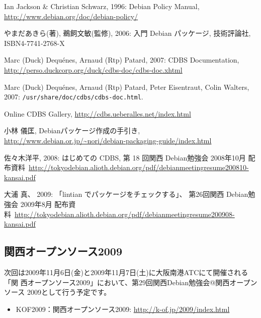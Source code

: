 \documentclass[mingoth,a4paper]{jsarticle}
\begin{document}
\begin{thebibliography}{99}
    Ian Jackson \& Christian Schwarz, 1996:
    Debian Policy Manual,
    \url{http://www.debian.org/doc/debian-policy/}

  やまだあきら(著), 鵜飼文敏(監修), 2006: 入門 Debian パッケージ, 技術評論社,
  ISBN4-7741-2768-X

  Marc (Duck) Dequ\'enes, Arnaud (Rtp) Patard, 2007:
  CDBS Documentation,
  \url{http://perso.duckcorp.org/duck/cdbs-doc/cdbs-doc.xhtml}
  
  Marc (Duck) Dequ\'enes, Arnaud (Rtp) Patard, 
  Peter Eisentraut, Colin Walters, 2007:
  {\tt /usr/share/doc/cdbs/cdbs-doc.html}.
  
  Online CDBS Gallery, 
  \url{http://cdbs.ueberalles.net/index.html}
  
  小林 儀匡, 
  Debianパッケージ作成の手引き,
  \url{http://www.debian.or.jp/~nori/debian-packaging-guide/index.html}

  佐々木洋平, 2008:
  はじめての CDBS,
  第 18 回関西 Debian勉強会 2008年10月 配布資料\
  \url{http://tokyodebian.alioth.debian.org/pdf/debianmeetingresume200810-kansai.pdf}
  
  大浦 真、 2009:
  「lintian でパッケージをチェックする」、
  第26回関西 Debian勉強会 2009年8月 配布資料\
  \url{http://tokyodebian.alioth.debian.org/pdf/debianmeetingresume200908-kansai.pdf}
\end{thebibliography}


\subsection{関西オープンソース2009}

次回は2009年11月6日(金)と2009年11月7日(土)に大阪南港ATCにて開催される「関
西オープンソース2009」において、第29回関西Debian勉強会@関西オープンソース
2009として行う予定です。

\begin{itemize}
 \item KOF2009：関西オープンソース2009:
       \url{http://k-of.jp/2009/index.html}
\end{itemize}
\end{document}
